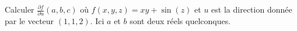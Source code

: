
\begin{exercice}\label{exoOutilsMath-0089}

    Calculer $\frac{ \partial f }{ \partial u }(a,b,c)$ où $f(x,y,z)=xy+\sin(z)$ et $u$ est la direction donnée par le vecteur $(1,1,2)$. Ici $a$ et $b$ sont deux réels quelconques.

\end{exercice}
